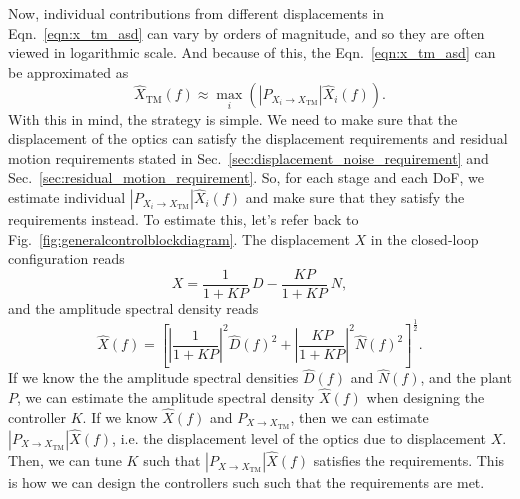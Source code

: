 Now, individual contributions from different displacements in Eqn.~\eqref{eqn:x_tm_asd} can vary by orders of magnitude, and so they are often viewed in logarithmic scale.
And because of this, the Eqn.~\eqref{eqn:x_tm_asd} can be approximated as
\begin{equation}
	\hat{X}_\mathrm{TM}(f) \approx \max_i \left(\left\lvert P_{X_i\to X_\mathrm{TM}} \right\rvert \hat{X}_i(f)\right).
\end{equation}
With this in mind, the strategy is simple.
We need to make sure that the displacement of the optics can satisfy the displacement requirements and residual motion requirements stated in Sec.~\ref{sec:displacement_noise_requirement} and Sec.~\ref{sec:residual_motion_requirement}.
So, for each stage and each DoF, we estimate individual $\left\lvert P_{X_i\to X_\mathrm{TM}}\right\rvert \hat{X}_i(f)$ and make sure that they satisfy the requirements instead.
To estimate this, let's refer back to Fig.~\ref{fig:generalcontrolblockdiagram}.
The displacement $X$ in the closed-loop configuration reads
\begin{equation}
	X = \frac{1}{1+KP}\ D - \frac{KP}{1+KP}\ N,
\end{equation}
and the amplitude spectral density reads
\begin{equation}
	\hat{X}(f) = \left[\left\lvert\frac{1}{1+KP}\right\rvert^2\hat{D}(f)^2 + \left\lvert\frac{KP}{1+KP}\right\rvert^2\hat{N}(f)^2\right]^\frac{1}{2}.
	\label{eqn:x_asd}
\end{equation}
If we know the the amplitude spectral densities $\hat{D}(f)$ and $\hat{N}(f)$, and the plant $P$, we can estimate the amplitude spectral density $\hat{X}(f)$ when designing the controller $K$.
If we know $\hat{X}(f)$ and $P_{X\to X_\mathrm{TM}}$, then we can estimate $\left\lvert P_{X\to X_\mathrm{TM}}\right\rvert \hat{X}(f)$, i.e. the displacement level of the optics due to displacement $X$.
Then, we can tune $K$ such that $\left\lvert P_{X\to X_\mathrm{TM}}\right\rvert \hat{X}(f)$ satisfies the requirements.
This is how we can design the controllers such such that the requirements are met.


